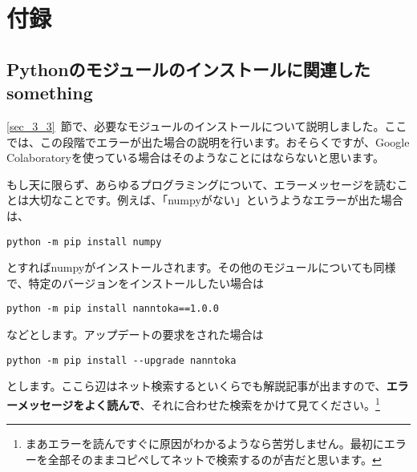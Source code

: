 \chapter*{付録}
\label{chap_appendix}

\setcounter{section}{0} %
\renewcommand{\thesection}{\Alph{section}} %
\setcounter{equation}{0} %
\renewcommand{\theequation}{\Alph{section}.\arabic{equation}}
\setcounter{figure}{0} %
\renewcommand{\thefigure}{\Alph{section}.\arabic{figure}}
\setcounter{table}{0} %
\renewcommand{\thetable}{\Alph{section}.\arabic{table}}

\section{Pythonのモジュールのインストールに関連したsomething}
\label{sec_app_1}
\ref{sec_3_3}~節で、必要なモジュールのインストールについて説明しました。ここでは、この段階でエラーが出た場合の説明を行います。おそらくですが、Google Colaboratoryを使っている場合はそのようなことにはならないと思います。

もし天に限らず、あらゆるプログラミングについて、エラーメッセージを読むことは大切なことです。例えば、「numpyがない」というようなエラーが出た場合は、
\begin{verbatim}
python -m pip install numpy
\end{verbatim}
とすればnumpyがインストールされます。その他のモジュールについても同様で、特定のバージョンをインストールしたい場合は
\begin{verbatim}
python -m pip install nanntoka==1.0.0
\end{verbatim}
などとします。アップデートの要求をされた場合は
\begin{verbatim}
python -m pip install --upgrade nanntoka
\end{verbatim}
とします。ここら辺はネット検索するといくらでも解説記事が出ますので、\textbf{エラーメッセージをよく読んで}、それに合わせた検索をかけて見てください。\footnote{まあエラーを読んですぐに原因がわかるようなら苦労しません。最初にエラーを全部そのままコピペしてネットで検索するのが吉だと思います。}
